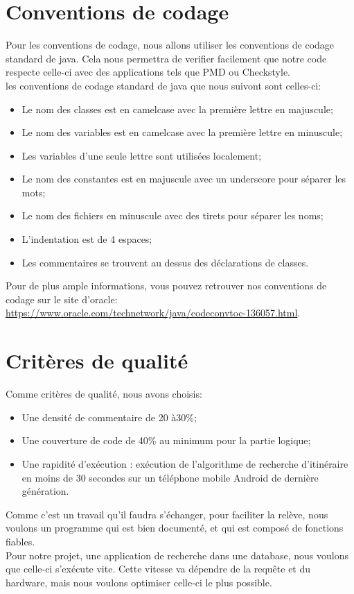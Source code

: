 \documentclass[a4paper,11pt]{article}
\begin{document}
\section{Conventions de codage}
Pour les conventions de codage, nous allons utiliser les conventions de codage standard de java.
Cela nous permettra de verifier facilement que notre code respecte celle-ci avec des applications tels que PMD ou Checkstyle.\\
les conventions de codage standard de java que nous suivont sont celles-ci:
\begin{itemize}
  \item Le nom des classes est en camelcase avec la première lettre en majuscule;
  \item Le nom des variables est en camelcase avec la première lettre en minuscule;
  \item Les variables d'une seule lettre sont utilisées localement;
  \item Le nom des constantes est en majuscule avec un underscore pour séparer les mots;
  \item Le nom des fichiers en minuscule avec des tirets pour séparer les noms;
  \item L'indentation est de 4 espaces;
  \item Les commentaires se trouvent au dessus des déclarations de classes.
\end{itemize}


Pour de plus ample informations, vous pouvez retrouver nos conventions de codage sur le site d'oracle:
\url{https://www.oracle.com/technetwork/java/codeconvtoc-136057.html}.

\section{Critères de qualité}
Comme critères de qualité, nous avons choisis:
\begin{itemize}
  \item Une densité de commentaire de 20 à30\%;
  \item Une couverture de code de 40\% au minimum pour la partie logique;
  \item Une rapidité d'exécution : exécution de l'algorithme de recherche d'itinéraire en moins de 30 secondes sur un téléphone mobile Android de dernière génération.
\end{itemize}


Comme c'est un travail qu'il faudra s'échanger, pour faciliter la relève,
nous voulons un programme qui est bien documenté, et qui est composé de fonctions fiables.\\
Pour notre projet, une application de recherche dans une database, nous voulons que celle-ci s'exécute vite.
Cette vitesse va dépendre de la requête et du hardware, mais nous voulons optimiser celle-ci le plus possible.
\end{document}
